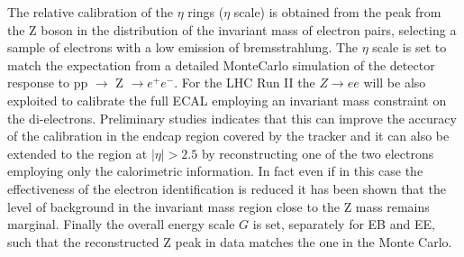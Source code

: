 \documentclass[journal]{IEEEtran}
\begin{document}
%
The relative calibration of the $\eta$ rings ($\eta$ scale) is obtained from the peak from the Z boson in the distribution of the invariant mass of electron pairs, selecting a sample of electrons with a low emission of bremsstrahlung. The $\eta$ scale is set to match the expectation from a detailed MonteCarlo simulation of the detector response to pp $\to$ Z $\to e^+e^-$. For the LHC Run II the $Z\to ee$ will be also exploited to calibrate the full ECAL employing an invariant mass constraint on the di-electrons. Preliminary studies indicates that this can improve the accuracy of the calibration in the endcap region covered by the tracker and it can also be extended to the region at $\vert\eta\vert>2.5$ by reconstructing one of the two electrons employing only the calorimetric information. In fact even if in this case the effectiveness of the electron identification is reduced it has been shown that the level of background in the invariant mass region close to the Z mass remains marginal.
Finally the overall energy scale $G$ is set, separately for EB and EE, such that the reconstructed Z peak in data matches the one in the Monte Carlo.
\end{document}
